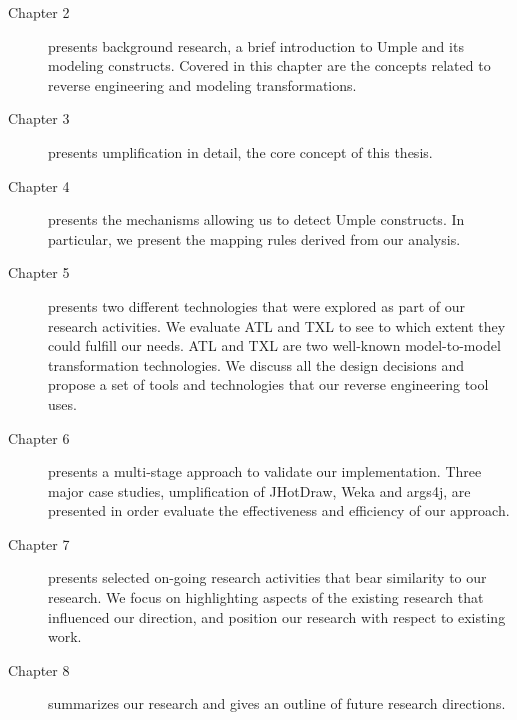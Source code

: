 \begin{description}
  \item[Chapter 2] presents background research, a brief introduction to Umple and its modeling constructs. Covered in this chapter are the concepts related to reverse engineering and modeling transformations. 

  \item[Chapter 3] presents umplification in detail, the core concept of this thesis. 

  \item[Chapter 4] presents the mechanisms allowing us to detect Umple constructs. In particular, we present the mapping rules derived from our analysis. 

  \item[Chapter 5] presents two different technologies that were explored as part of our research activities. We evaluate ATL and TXL to see to which extent they could fulfill our needs. ATL and TXL are two well-known model-to-model transformation technologies. We discuss all the design decisions and propose a set of tools and technologies that our reverse engineering tool uses.

    \item[Chapter 6] presents a multi-stage approach to validate our implementation. Three major case studies, umplification of JHotDraw, Weka and args4j,  are presented in order evaluate the effectiveness and efficiency of our approach.

    \item[Chapter 7] presents  selected on-going research activities that bear similarity to our research. We focus on highlighting aspects of the existing research that influenced our direction, and position our research with respect to existing work.

    \item[Chapter 8] summarizes our research and gives an outline of future research directions.
\end{description}


